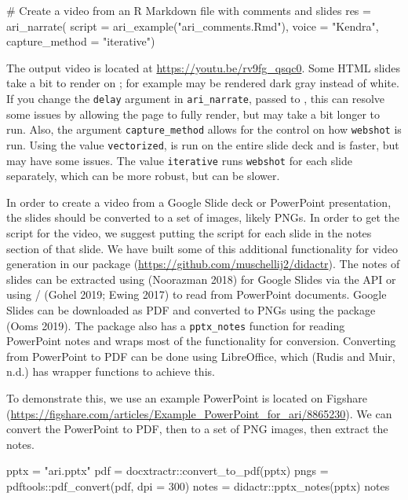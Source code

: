 \begin{Schunk}
\begin{Sinput}
# Create a video from an R Markdown file with comments and slides
res = ari_narrate(
  script = ari_example("ari_comments.Rmd"),
  voice = "Kendra",
  capture_method = "iterative")
\end{Sinput}
\end{Schunk}

The output video is located at \url{https://youtu.be/rv9fg_qsqc0}. Some
HTML slides take a bit to render on ; for example may be
rendered dark gray instead of white. If you change the \texttt{delay}
argument in \texttt{ari\_narrate}, passed to , this can
resolve some issues by allowing the page to fully render, but may take a
bit longer to run. Also, the argument \texttt{capture\_method} allows
for the control on how \texttt{webshot} is run. Using the value
\texttt{vectorized},  is run on the entire slide deck and
is faster, but may have some issues. The value \texttt{iterative} runs
\texttt{webshot} for each slide separately, which can be more robust,
but can be slower.

In order to create a video from a Google Slide deck or PowerPoint
presentation, the slides should be converted to a set of images, likely
PNGs. In order to get the script for the video, we suggest putting the
script for each slide in the notes section of that slide. We have built
some of this additional functionality for video generation in our
package  (\url{https://github.com/muschellij2/didactr}).
The notes of slides can be extracted using 
(Noorazman 2018) for Google Slides via the API or using
/ (Gohel 2019; Ewing 2017) to read
from PowerPoint documents. Google Slides can be downloaded as PDF and
converted to PNGs using the  package (Ooms 2019). The
 package also has a \texttt{pptx\_notes} function for
reading PowerPoint notes and wraps most of the functionality for
conversion. Converting from PowerPoint to PDF can be done using
LibreOffice, which  (Rudis and Muir, n.d.) has
wrapper functions to achieve this.

To demonstrate this, we use an example PowerPoint is located on Figshare
(\url{https://figshare.com/articles/Example_PowerPoint_for_ari/8865230}).
We can convert the PowerPoint to PDF, then to a set of PNG images, then
extract the notes.

\begin{Schunk}
\begin{Sinput}
pptx = "ari.pptx"
pdf = docxtractr::convert_to_pdf(pptx)
pngs = pdftools::pdf_convert(pdf, dpi = 300)
notes = didactr::pptx_notes(pptx)
notes
\end{Sinput}
\end{Schunk}

